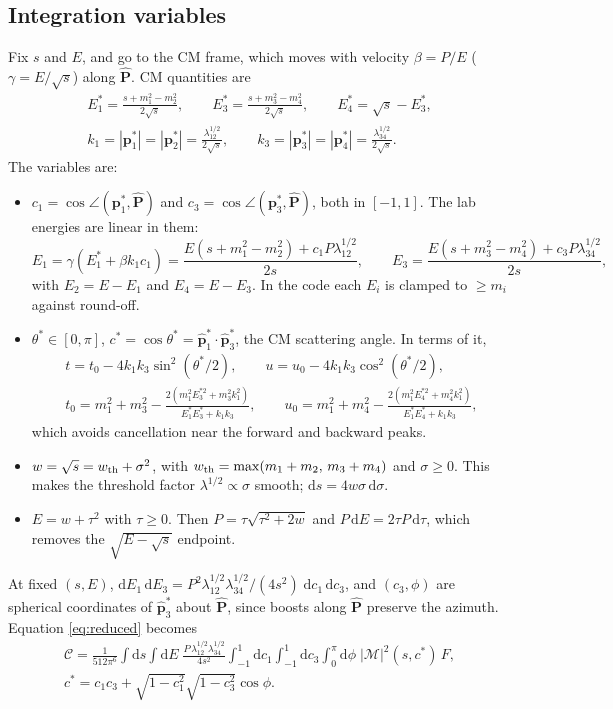 \documentclass[11pt,a4paper]{article}
\newcommand{\dd}{\mathrm{d}}
\newcommand{\Msq}{|\mathcal{M}|^2}
\begin{document}
\subsection{Integration variables}

Fix $s$ and $E$, and go to the CM frame, which moves with velocity
$\beta=P/E$ ($\gamma=E/\sqrt s$) along $\hat{\mathbf{P}}$. CM quantities are
\begin{gather}
  E_1^*=\frac{s+m_1^2-m_2^2}{2\sqrt s},\qquad
  E_3^*=\frac{s+m_3^2-m_4^2}{2\sqrt s},\qquad
  E_4^*=\sqrt s-E_3^*,\\
  k_1=|\mathbf{p}_1^*|=|\mathbf{p}_2^*|=\frac{\lambda_{12}^{1/2}}{2\sqrt s},\qquad
  k_3=|\mathbf{p}_3^*|=|\mathbf{p}_4^*|=\frac{\lambda_{34}^{1/2}}{2\sqrt s}.
\end{gather}
The variables are:
\begin{itemize}
\item $c_1=\cos\angle(\mathbf{p}_1^*,\hat{\mathbf{P}})$ and
  $c_3=\cos\angle(\mathbf{p}_3^*,\hat{\mathbf{P}})$, both in $[-1,1]$. The
  lab energies are linear in them:
  \begin{equation}
    E_1 = \gamma(E_1^*+\beta k_1c_1) = \frac{E(s+m_1^2-m_2^2)+c_1P\lambda_{12}^{1/2}}{2s},
    \qquad
    E_3 = \frac{E(s+m_3^2-m_4^2)+c_3P\lambda_{34}^{1/2}}{2s},
  \end{equation}
  with $E_2=E-E_1$ and $E_4=E-E_3$. In the code each $E_i$ is clamped to
  $\ge m_i$ against round-off.
\item $\theta^*\in[0,\pi]$, $c^*=\cos\theta^*=\hat{\mathbf{p}}_1^*\cdot\hat{\mathbf{p}}_3^*$,
  the CM scattering angle. In terms of it,
  \begin{gather}
    t = t_0-4k_1k_3\sin^2(\theta^*/2),\qquad u = u_0-4k_1k_3\cos^2(\theta^*/2),\\
    t_0 = m_1^2+m_3^2-\frac{2(m_1^2E_3^{*2}+m_3^2k_1^2)}{E_1^*E_3^*+k_1k_3},\qquad
    u_0 = m_1^2+m_4^2-\frac{2(m_1^2E_4^{*2}+m_4^2k_1^2)}{E_1^*E_4^*+k_1k_3},
  \end{gather}
  which avoids cancellation near the forward and backward peaks.
\item $w=\sqrt s = w_{\rm th}+\sigma^2$, with $w_{\rm th}=\max(m_1+m_2,\,m_3+m_4)$
  and $\sigma\ge0$. This makes the threshold factor $\lambda^{1/2}\propto\sigma$
  smooth; $\dd s = 4w\sigma\,\dd\sigma$.
\item $E = w+\tau^2$ with $\tau\ge0$. Then $P=\tau\sqrt{\tau^2+2w}$ and
  $P\,\dd E = 2\tau P\,\dd\tau$, which removes the $\sqrt{E-\sqrt s}$ endpoint.
\end{itemize}
At fixed $(s,E)$, $\dd E_1\,\dd E_3 = P^2\lambda_{12}^{1/2}\lambda_{34}^{1/2}/(4s^2)\;\dd c_1\,\dd c_3$,
and $(c_3,\phi)$ are spherical coordinates of $\hat{\mathbf{p}}_3^*$ about
$\hat{\mathbf P}$, since boosts along $\hat{\mathbf P}$ preserve the azimuth.
Equation \eqref{eq:reduced} becomes
\begin{gather}
  \mathcal{C} = \frac{1}{512\pi^6}\int\dd s\int\dd E\;
  \frac{P\,\lambda_{12}^{1/2}\lambda_{34}^{1/2}}{4s^2}
  \int_{-1}^1\!\dd c_1\int_{-1}^1\!\dd c_3\int_0^\pi\!\dd\phi\;\Msq(s,c^*)\,F,\\
  c^*=c_1c_3+\sqrt{1-c_1^2}\sqrt{1-c_3^2}\cos\phi .
\end{gather}
\end{document}
